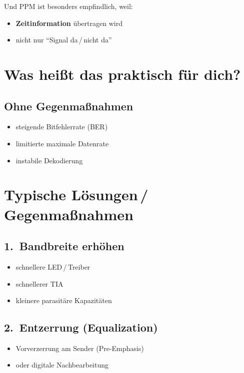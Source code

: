 \documentclass[a4paper,12pt]{article}
\begin{document}
Und PPM ist besonders empfindlich, weil:

\begin{itemize}
  \item \textbf{Zeitinformation} übertragen wird
  \item nicht nur \enquote{Signal da\,/\,nicht da}
\end{itemize}

\section*{Was heißt das praktisch für dich?}

\subsection*{Ohne Gegenmaßnahmen}

\begin{itemize}
  \item steigende Bitfehlerrate (BER)
  \item limitierte maximale Datenrate
  \item instabile Dekodierung
\end{itemize}

\section*{Typische Lösungen\,/\,Gegenmaßnahmen}

\subsection*{1.\ Bandbreite erhöhen}

\begin{itemize}
  \item schnellere LED\,/\,Treiber
  \item schnellerer TIA
  \item kleinere parasitäre Kapazitäten
\end{itemize}

\subsection*{2.\ Entzerrung (Equalization)}

\begin{itemize}
  \item Vorverzerrung am Sender (Pre-Emphasis)
  \item oder digitale Nachbearbeitung
\end{itemize}
\end{document}
